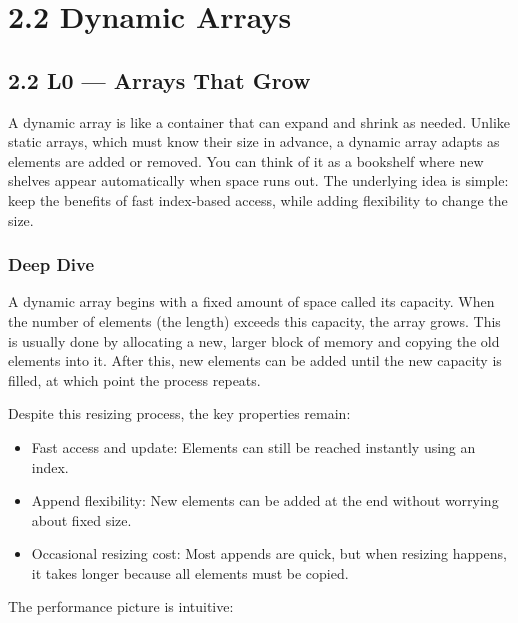 \documentclass[
  letterpaper,
  DIV=11,
  numbers=noendperiod]{scrreprt}
\providecommand{\tightlist}{%
  \setlength{\itemsep}{0pt}\setlength{\parskip}{0pt}}
\begin{document}
\section{2.2 Dynamic Arrays}\label{dynamic-arrays}

\subsection{2.2 L0 --- Arrays That Grow}\label{l0-arrays-that-grow-1}

A dynamic array is like a container that can expand and shrink as
needed. Unlike static arrays, which must know their size in advance, a
dynamic array adapts as elements are added or removed. You can think of
it as a bookshelf where new shelves appear automatically when space runs
out. The underlying idea is simple: keep the benefits of fast
index-based access, while adding flexibility to change the size.

\subsubsection{Deep Dive}\label{deep-dive-6}

A dynamic array begins with a fixed amount of space called its capacity.
When the number of elements (the length) exceeds this capacity, the
array grows. This is usually done by allocating a new, larger block of
memory and copying the old elements into it. After this, new elements
can be added until the new capacity is filled, at which point the
process repeats.

Despite this resizing process, the key properties remain:

\begin{itemize}
\tightlist
\item
  Fast access and update: Elements can still be reached instantly using
  an index.
\item
  Append flexibility: New elements can be added at the end without
  worrying about fixed size.
\item
  Occasional resizing cost: Most appends are quick, but when resizing
  happens, it takes longer because all elements must be copied.
\end{itemize}

The performance picture is intuitive:
\end{document}
